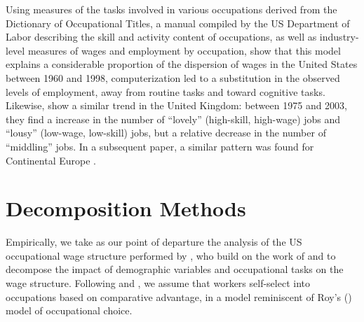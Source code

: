 \cite{Coelli2009}




Using measures of the tasks involved in various occupations derived from the Dictionary of Occupational Titles, a manual compiled by the US Department of Labor describing the skill and activity content of occupations, as well as industry-level measures of wages and employment by occupation, \citet{Levy2003} show that this model explains a considerable proportion of the dispersion of wages in the United States between 1960 and 1998, computerization led to a substitution in the observed levels of employment, away from routine tasks and toward cognitive tasks. Likewise, \citet{Goos2007} show a similar trend in the United Kingdom: between 1975 and 2003, they find a increase in the number of ``lovely'' (high-skill, high-wage) jobs and ``lousy'' (low-wage, low-skill) jobs, but a relative decrease in the number of ``middling'' jobs. In a subsequent paper, a similar pattern was found for Continental Europe \citep{Goos2009}.




\section{Decomposition Methods}

Empirically, we take as our point of departure the analysis of the US occupational wage structure performed by \citet{Fortin2011}, who build on the work of \citet{Oaxaca1973} and \citet{Juhn1993} to decompose the impact of demographic variables and occupational tasks on the wage structure. Following \citet{Autor2012} and \citet{Fortin2011}, we assume that workers self-select into occupations based on comparative advantage, in a model reminiscent of Roy's (\citeyear{Roy1951}) model of occupational choice.

